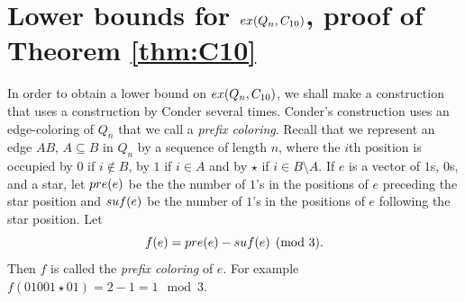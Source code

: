 \documentclass[11pt, a4paper]{article}
\newcommand{\ex}{{\rm  ex}}
\newcommand{\pre}{{\rm pre}}
\newcommand{\suf}{{\rm suf}}
\begin{document}
\section{Lower bounds for $\ex(Q_n, C_{10})$, proof of Theorem \ref{thm:C10}}\label{sec:C10}

In order to obtain a lower bound on  $\ex(Q_n, C_{10})$, we shall make a construction that uses a construction by Conder   \cite{conder} several times.   Conder's construction uses an edge-coloring of $Q_n$ that we call a {\it prefix coloring}. 
Recall that we represent an edge $AB$, $A\subseteq B$ in $Q_n$ by a sequence of length $n$, 
where the $i$th position is occupied by $0$ if $i\notin B$,  by $1$ if $i\in A$ and by $\star$ if $i\in B\setminus A$. 
If $e$ is a  vector of $1$s, $0$s, and a star,  let  $\pre(e)$ be the the number of $1$'s in the positions of $e$ preceding the star position and  $\suf(e)$ be  the number of $1$'s in the positions of $e$ following the star position. 
Let $$f(e)= \pre(e)-\suf(e) \pmod 3.$$  Then $f$ is called the {\it prefix coloring} of $e$.  For example $f(01001\star 01) = 2 - 1 =1 \mod 3 $. 
\end{document}
